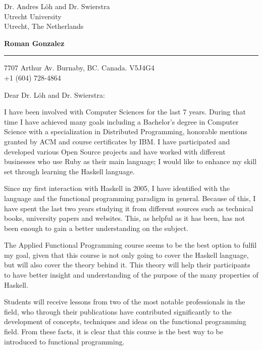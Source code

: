 \documentclass{letter} %
\begin{document}
\signature{Roman Gonzalez.}           %
\longindentation=0pt                  %
\let\raggedleft\raggedright           %
 
 
\begin{letter}{Dr. Andres L\"oh and Dr. Swierstra\\
Utrecht University \\
Utrecht, The Netherlands}


\begin{flushleft}
{\large\bf Roman Gonzalez}
\end{flushleft}
\medskip\hrule height 1pt
\begin{flushright}
\hfill 7707 Arthur Av. Burnaby, BC. Canada. V5J4G4 \\
\hfill +1 (604) 728-4864
\end{flushright} 


 
\opening{Dear Dr. L\"oh and Dr. Swierstra:} 
 
\noindent I have been involved with Computer Sciences for the last 7 years. 
During that time I have achieved many goals including a Bachelor's degree in 
Computer Science with a specialization in Distributed Programming, honorable 
mentions granted by ACM and course certificates by IBM. I have participated and developed various Open 
Source projects and have worked with different businesses who use Ruby as their 
main language; I would like to enhance my skill set through learning the Haskell language.

\noindent Since my first interaction with Haskell in 2005, I have identified with the 
language and the functional programming paradigm in general. Because of this, I have spent the last two years
studying it from different sources such as technical books, university papers and websites. 
This, as helpful as it has been, has not been enough to gain a better understanding on the subject.

\noindent The Applied Functional Programming course seems to be the best option to fulfil my goal, given that this 
course is not only going to cover the Haskell language, but will also cover the theory behind it. This theory will help their participants to have better insight and understanding of the purpose of the many properties of Haskell. 

\noindent Students will receive lessons from two of the most notable professionals in the field, who through 
their publications have contributed significantly to the development of concepts, techniques and ideas on the functional
programming field. From these facts, it is clear that this course is the best way to be introduced to functional programming.


\end{letter}
\end{document}
